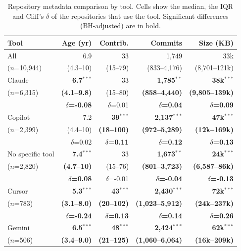 \begin{table}[t]
\centering
\small
\caption{Repository metadata comparison by tool. Cells show the median, the IQR and Cliff's $\delta$ of the repositories that use the tool. Significant differences (BH-adjusted) are in bold.}
\label{tab:repo-metadata-comparison}
\begin{tabular}{lrrrr}
\toprule
\textbf{Tool} & \textbf{Age (yr)} & \textbf{Contrib.} & \textbf{Commits} & \textbf{Size (KB)} \\
\midrule
All & 6.9 & 33 & 1,749 & 33k \\
($n$=10,944) & (4.3--10) & (15--79) & (833--4,176) & (8,701--121k) \\
\midrule
Claude & \textbf{6.7$^{***}$} & 33 & \textbf{1,785$^{**}$} & \textbf{38k$^{***}$} \\
($n$=6,315) & \textbf{(4.1--9.8)} & (15--80) & \textbf{(858--4,440)} & \textbf{(9,805--139k)} \\
 & \textbf{$\delta$=-0.08} & $\delta$=0.01 & \textbf{$\delta$=0.04} & \textbf{$\delta$=0.09} \\
\addlinespace
Copilot & 7.2 & \textbf{39$^{***}$} & \textbf{2,137$^{***}$} & \textbf{47k$^{***}$} \\
($n$=2,399) & (4.4--10) & \textbf{(18--100)} & \textbf{(972--5,289)} & \textbf{(12k--169k)} \\
 & $\delta$=0.02 & \textbf{$\delta$=0.11} & \textbf{$\delta$=0.12} & \textbf{$\delta$=0.13} \\
\addlinespace
No specific tool & \textbf{7.4$^{***}$} & 33 & \textbf{1,673$^{**}$} & \textbf{24k$^{***}$} \\
($n$=2,820) & \textbf{(4.7--10)} & (15--76) & \textbf{(801--3,723)} & \textbf{(6,587--86k)} \\
 & \textbf{$\delta$=0.08} & $\delta$=-0.01 & \textbf{$\delta$=-0.04} & \textbf{$\delta$=-0.13} \\
\addlinespace
Cursor & \textbf{5.3$^{***}$} & \textbf{43$^{***}$} & \textbf{2,430$^{***}$} & \textbf{72k$^{***}$} \\
($n$=783) & \textbf{(3.1--8.0)} & \textbf{(20--102)} & \textbf{(1,023--5,912)} & \textbf{(24k--237k)} \\
 & \textbf{$\delta$=-0.24} & \textbf{$\delta$=0.13} & \textbf{$\delta$=0.14} & \textbf{$\delta$=0.26} \\
\addlinespace
Gemini & \textbf{6.5$^{***}$} & \textbf{48$^{***}$} & \textbf{2,424$^{***}$} & \textbf{62k$^{***}$} \\
($n$=506) & \textbf{(3.4--9.0)} & \textbf{(21--125)} & \textbf{(1,060--6,064)} & \textbf{(16k--209k)} \\

\end{tabular}
\end{table}
